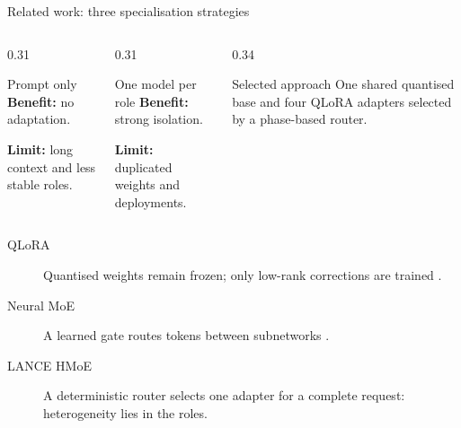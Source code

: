 \documentclass[aspectratio=169,10pt]{beamer}
\begin{document}
\begin{frame}{Related work: three specialisation strategies}
  \begin{columns}[T,onlytextwidth]
    \begin{column}{0.31\textwidth}
      \begin{block}{Prompt only}
        \textbf{Benefit:} no adaptation.\par
        \vspace{0.35em}
        \textbf{Limit:} long context and less stable roles.
      \end{block}
    \end{column}
    \begin{column}{0.31\textwidth}
      \begin{block}{One model per role}
        \textbf{Benefit:} strong isolation.\par
        \vspace{0.35em}
        \textbf{Limit:} duplicated weights and deployments.
      \end{block}
    \end{column}
    \begin{column}{0.34\textwidth}
      \begin{exampleblock}{Selected approach}
        One shared quantised base and four QLoRA adapters selected by a
        phase-based router.
      \end{exampleblock}
    \end{column}
  \end{columns}

  \vspace{0.7em}
  \begin{description}
    \item[QLoRA] Quantised weights remain frozen; only low-rank corrections are
      trained \cite{dettmers2023qlora}.
    \item[Neural MoE] A learned gate routes tokens between subnetworks
      \cite{shazeer2017moe}.
    \item[LANCE HMoE] A deterministic router selects one adapter for a complete
      request: heterogeneity lies in the roles.
  \end{description}
\end{frame}
\end{document}

